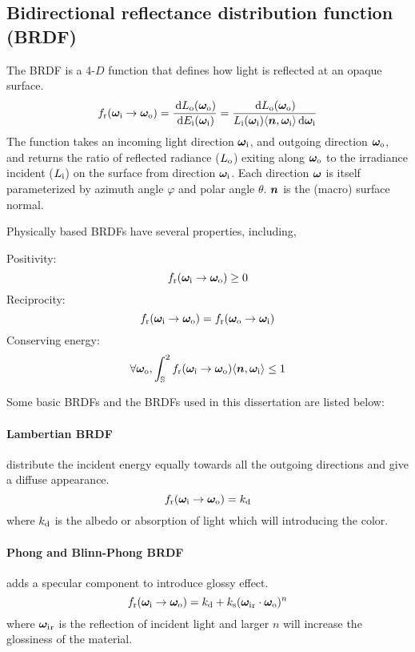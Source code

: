 \subsection{Bidirectional reflectance distribution function (BRDF)}
The BRDF is a 4-$D$ function that defines how light is reflected at an opaque surface. 
\begin{equation}
	f_\mathrm{r}(\bm\omega_\mathrm{i}\rightarrow\bm\omega_\mathrm{o}) = \frac{\,\mathrm{d} L_\mathrm{o}(\bm\omega_\mathrm{o})}{\,\mathrm{d} E_\mathrm{i}(\bm\omega_\mathrm{i})}
	= \frac{\,\mathrm{d}L_\mathrm{o}(\bm\omega_\mathrm{o})}{L_\mathrm{i}(\bm\omega_\mathrm{i}){\langle \bm{n},\bm\omega_\mathrm{i} \rangle}\,\mathrm{d}\bm\omega_\mathrm{i}}
\end{equation}
The function takes an incoming light direction $\bm\omega_\mathrm{i}$, and outgoing direction $\bm\omega_\mathrm{o}$, and returns the ratio of reflected radiance ($L_\mathrm{o}$) exiting along $\bm\omega_\mathrm{o}$ to the irradiance incident ($L_\mathrm{i}$) on the surface from direction $\bm\omega_\mathrm{i}$. Each direction $\bm\omega$ is itself parameterized by azimuth angle $\varphi$ and polar angle $\theta$. $\bm{n}$ is the (macro) surface normal.

Physically based BRDFs have several properties, including,

Positivity: 
\begin{equation}
	f_\mathrm{r}(\bm\omega_\mathrm{i}\rightarrow\bm\omega_\mathrm{o}) \geq 0
\end{equation}
Reciprocity:
\begin{equation}
	f_\mathrm{r}(\bm\omega_\mathrm{i}\rightarrow\bm\omega_\mathrm{o}) = f_\mathrm{r}(\bm\omega_\mathrm{o}\rightarrow\bm\omega_\mathrm{i})
\end{equation}
Conserving energy:
\begin{equation}
	\forall\bm\omega_\mathrm{o}, \int_\mathbb{S}^2 f_\mathrm{r}(\bm\omega_\mathrm{i}\rightarrow\bm\omega_\mathrm{o}) {\langle \bm{n},\bm\omega_\mathrm{i} \rangle} \leq 1
\end{equation}

Some basic BRDFs and the BRDFs used in this dissertation are listed below:

\paragraph{Lambertian BRDF} distribute the incident energy equally towards all the outgoing directions and give a diffuse appearance.
\begin{equation}
	f_\mathrm{r}(\bm\omega_\mathrm{i}\rightarrow\bm\omega_\mathrm{o}) = k_\mathrm{d}
\end{equation}
where $k_\mathrm{d}$ is the albedo or absorption of light which will introducing the color.

\paragraph{Phong and Blinn-Phong BRDF} adds a specular component to introduce glossy effect.
\begin{equation}
	f_\mathrm{r}(\bm\omega_\mathrm{i}\rightarrow\bm\omega_\mathrm{o}) = k_\mathrm{d} + k_\mathrm{s}({\bm\omega_\mathrm{i}}_\mathrm{r} \cdot \bm\omega_\mathrm{o})^n
\end{equation}
where ${\bm\omega_\mathrm{i}}_\mathrm{r}$ is the reflection of incident light and larger $n$ will increase the glossiness of the material. 

